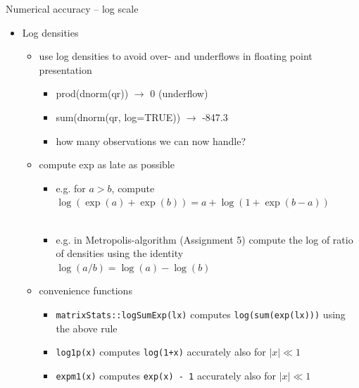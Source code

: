\documentclass[english,t]{beamer}
\begin{document}
\begin{frame}{Numerical accuracy -- log scale}

  \begin{itemize}
  \item Log densities
    \begin{itemize}
    \item use log densities to avoid over- and underflows in floating
      point presentation
      \begin{itemize}
      \item {\color{navyblue} prod(dnorm(qr)) $\rightarrow$} {\color{red} 0 (underflow)}
      \item {\color{navyblue} sum(dnorm(qr, log=TRUE)) $\rightarrow$} {\color{darkgreen} -847.3}
      \item<2-> how many observations we can now handle? %
    \end{itemize}
    \item<3-> compute exp as late as possible
      \begin{itemize}
      \item<4-> e.g. for $a>b$, compute $\log(\exp(a)+\exp(b)) = a + \log(1+\exp(b-a))$\\
        \\
      \item<7-> e.g. in Metropolis-algorithm (Assignment 5) compute the log of ratio of densities using the identity\\
        $\log(a/b)=\log(a)-\log(b)$
    \end{itemize}
  \item<8-> convenience functions
    \begin{itemize}
    \item \texttt{matrixStats::logSumExp(lx)} computes
      \texttt{log(sum(exp(lx)))} using the above rule
    \item \texttt{log1p(x)} computes \texttt{log(1+x)} accurately also for $|x| \ll 1$
    \item \texttt{expm1(x)} computes \texttt{exp(x) - 1} accurately also for $|x| \ll 1$
    \end{itemize}
    \end{itemize}
  \end{itemize}

\end{frame}
\end{document}
